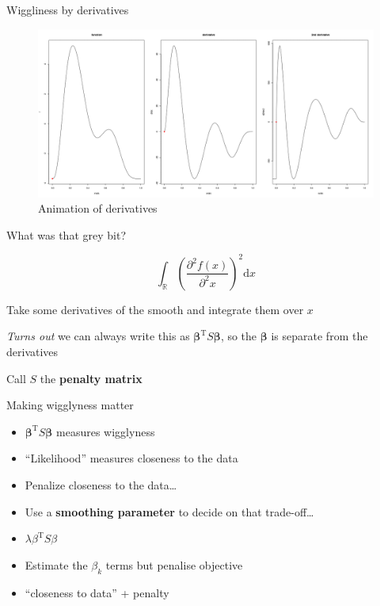 \documentclass[10pt,ignorenonframetext,compress, aspectratio=169]{beamer}
\providecommand{\tightlist}{%
  \setlength{\itemsep}{0pt}\setlength{\parskip}{0pt}}
\begin{document}
\begin{frame}{Wiggliness by derivatives}

\begin{figure}[htbp]
\centering
\includegraphics{wiggly.gif}
\caption{Animation of derivatives}
\end{figure}

\end{frame}

\begin{frame}{What was that grey bit?}

\[
\int_\mathbb{R} \left( \frac{\partial^2 f(x)}{\partial^2 x}\right)^2 \text{d}x
\]

Take some derivatives of the smooth and integrate them over \(x\)

\emph{Turns out} we can always write this as
\(\boldsymbol{\beta}^{\text{T}}S\boldsymbol{\beta}\), so the
\(\boldsymbol{\beta}\) is separate from the derivatives

Call \(S\) the \textbf{penalty matrix}

\end{frame}

\begin{frame}{Making wigglyness matter}

\begin{itemize}
\tightlist
\item
  \(\boldsymbol{\beta}^\text{T}S\boldsymbol{\beta}\) measures wigglyness
\item
  ``Likelihood'' measures closeness to the data
\item
  Penalize closeness to the data\ldots{}
\item
  Use a \textbf{smoothing parameter} to decide on that trade-off\ldots{}
\item
  \(\lambda \beta^\text{T}S\beta\)
\item
  Estimate the \(\beta_k\) terms but penalise objective
\item
  ``closeness to data'' + penalty
\end{itemize}

\end{frame}
\end{document}
